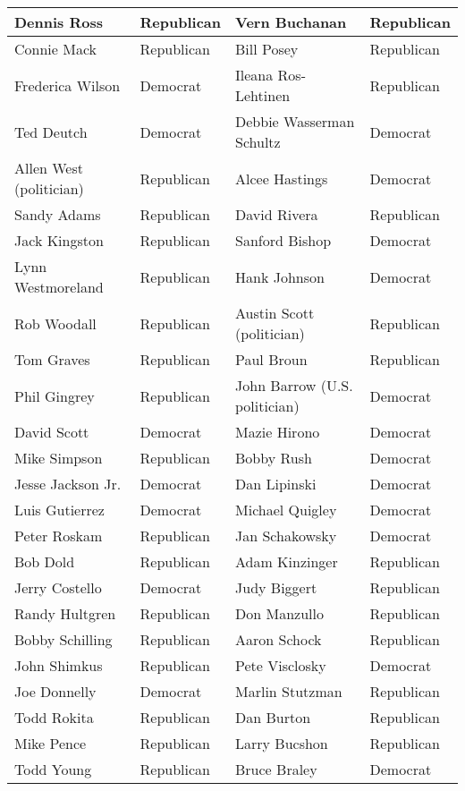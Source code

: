 \documentclass[10pt,11pt,12pt,oneside]{book}
\begin{document}
\begin{appendices}
\begin{table}[H]
\begin{tabular}{|p{2in}|p{0.5in}||p{2in}|p{0.5in}|}
		Dennis Ross & Republican & Vern Buchanan & Republican\\ \hline
		Connie Mack & Republican & Bill Posey & Republican\\ \hline
		Frederica Wilson & Democrat & Ileana Ros-Lehtinen & Republican\\ \hline
		Ted Deutch & Democrat & Debbie Wasserman Schultz & Democrat\\ \hline
		Allen West (politician) & Republican & Alcee Hastings & Democrat\\ \hline
		Sandy Adams & Republican & David Rivera & Republican\\ \hline
		Jack Kingston & Republican & Sanford Bishop & Democrat\\ \hline
		Lynn Westmoreland & Republican & Hank Johnson & Democrat\\ \hline
		Rob Woodall & Republican & Austin Scott (politician) & Republican\\ \hline
		Tom Graves & Republican & Paul Broun & Republican\\ \hline
		Phil Gingrey & Republican & John Barrow (U.S. politician) & Democrat\\ \hline
		David Scott & Democrat & Mazie Hirono & Democrat\\ \hline
		Mike Simpson & Republican & Bobby Rush & Democrat\\ \hline
		Jesse Jackson Jr. & Democrat & Dan Lipinski & Democrat\\ \hline
		Luis Gutierrez & Democrat & Michael Quigley & Democrat\\ \hline
		Peter Roskam & Republican & Jan Schakowsky & Democrat\\ \hline
		Bob Dold & Republican & Adam Kinzinger & Republican\\ \hline
		Jerry Costello & Democrat & Judy Biggert & Republican\\ \hline
		Randy Hultgren & Republican & Don Manzullo & Republican\\ \hline
		Bobby Schilling & Republican & Aaron Schock & Republican\\ \hline
		John Shimkus & Republican & Pete Visclosky & Democrat\\ \hline
		Joe Donnelly & Democrat & Marlin Stutzman & Republican\\ \hline
		Todd Rokita & Republican & Dan Burton & Republican\\ \hline
		Mike Pence & Republican & Larry Bucshon & Republican\\ \hline
		Todd Young & Republican & Bruce Braley & Democrat\\ \hline



\end{tabular}
\end{table}
\end{appendices}
\end{document}

